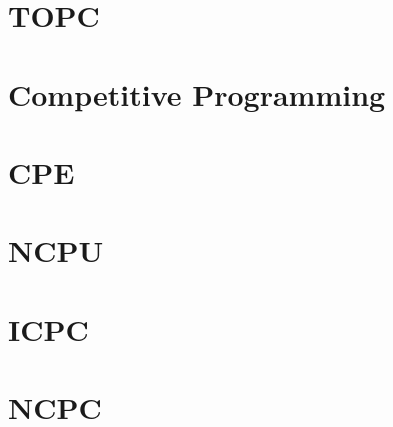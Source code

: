 \documentclass[a4paper]{article}
\begin{document}
\maketitle
\tableofcontents
\newpage
\section{TOPC}


\section{Competitive Programming}





\section{CPE}





\section{NCPU}




\section{ICPC}


\section{NCPC}


\end{document}
